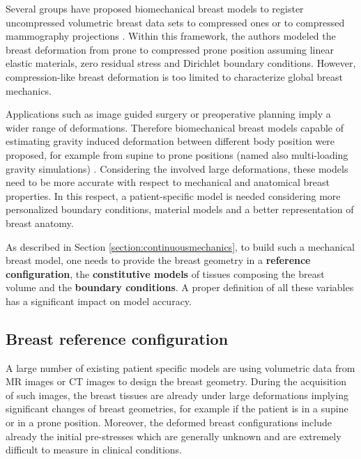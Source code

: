 Several groups have proposed biomechanical breast models to register uncompressed volumetric breast data sets to compressed ones \citep{han_development_2012,ruiter_model_based_2006,sturgeon_finite_element_2016} or to compressed  mammography projections \citep{kellner_simulation_2007}. Within this framework, the authors modeled the breast deformation from prone to compressed prone position assuming linear elastic materials, zero residual stress and Dirichlet boundary conditions.
However, compression-like breast deformation is too limited to characterize global breast mechanics.

 Applications such as image guided surgery or preoperative planning imply a wider range of deformations. Therefore biomechanical breast models capable of estimating gravity induced deformation between different body position were proposed, for example from supine to prone positions (named also multi-loading gravity simulations) \citep{gamage_modelling_2012,georgii_simulation_2016,eiben_surface_2016}. Considering the involved large deformations, these models need to be more accurate with respect to mechanical and anatomical breast properties. In this respect, a patient-specific model is needed considering more personalized boundary conditions, material models and a better representation of breast anatomy. 

 
As described in Section \ref{section:continuousmechanics}, to build such a mechanical breast model, one needs to provide the breast geometry in a \textbf{reference configuration}, the \textbf{constitutive models} of tissues composing the breast volume and the \textbf{boundary conditions}. A proper definition of all these variables has a significant impact on model accuracy.

\subsection{Breast reference configuration} 

A large number of existing patient specific models are using volumetric data from MR images \citep{carter_biomechanical_2009,kellner_simulation_2007, conley_realization_2015, eiben_symmetric_2016, martinez_finite_2017}  or CT images \citep{palomar_finite_2008, sturgeon_finite_element_2016} to design the breast geometry. During the acquisition of such images, the breast tissues are already under large deformations implying significant changes of breast geometries, for example if the patient is in a supine or in a prone position. Moreover, the deformed breast configurations include already the initial pre-stresses which are generally unknown and are extremely difficult to measure in clinical conditions. 
 

